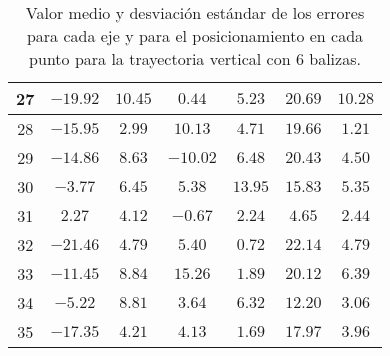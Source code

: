 \begin{table}[H]
\begin{tabular}{|c|c|c|c|c|c|c|}
                    27     & $-19.92$    &$10.45$  &  $0.44$   & $5.23$   & $20.69$  & $10.28$ \\ \hline
                    28     & $-15.95$    &$2.99$   &  $10.13$  & $4.71$   & $19.66$  & $1.21$  \\ \hline
                    29     & $-14.86$    &$8.63$   &  $-10.02$ & $6.48$   & $20.43$  & $4.50$  \\ \hline
                    30     & $-3.77$     &$6.45$   &  $5.38$   & $13.95$  & $15.83$  & $5.35$  \\ \hline
                    31     & $2.27$      &$4.12$   &  $-0.67$  & $2.24$   & $4.65$   & $2.44$  \\ \hline
                    32     & $-21.46$    &$4.79$   &  $5.40$   & $0.72$   & $22.14$  & $4.79$  \\ \hline
                    33     & $-11.45$    &$8.84$   &  $15.26$  & $1.89$   & $20.12$  & $6.39$  \\ \hline
                    34     & $-5.22$     &$8.81$   &  $3.64$   & $6.32$   & $12.20$  & $3.06$  \\ \hline
                    35     & $-17.35$    &$4.21$   &  $4.13$   & $1.69$   & $17.97$  & $3.96$  \\ \hline
    \end{tabular}
    \caption{Valor medio y desviación estándar de los errores para cada eje y para el posicionamiento en cada punto para la trayectoria vertical con 6 balizas.}
    \label{tab:media_lab_6_vertical}
\end{table}


